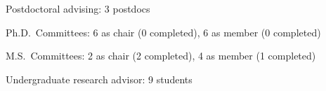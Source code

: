 \begin{veryTightItemize}
    \item Postdoctoral advising: 3 postdocs
    \item Ph.D.\ Committees: 6 as chair (0 completed), 6 as member (0 completed)
    \item M.S.\ Committees:  2 as chair (2 completed), 4 as member (1 completed)
    \item Undergraduate research advisor: 9 students
\end{veryTightItemize}
